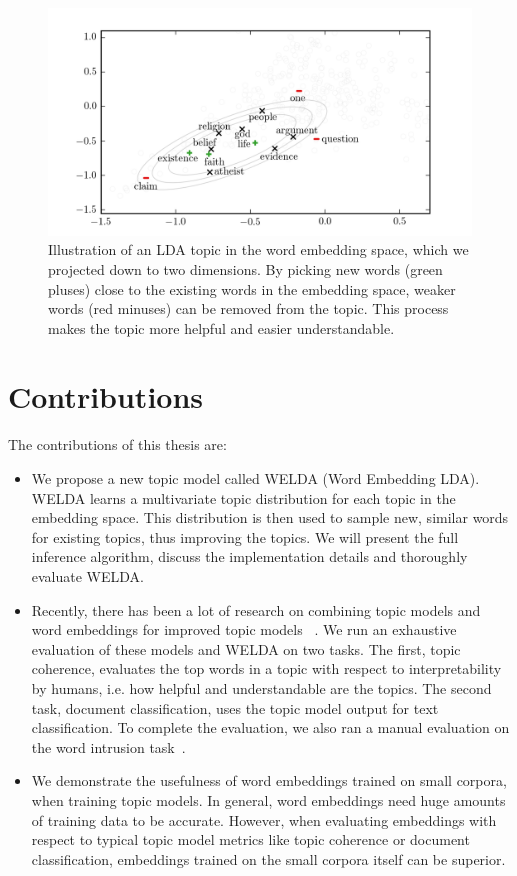 \documentclass[
        a4paper,
        titlepage,
        twoside,
        parskip,
        numbers=noenddot
        ]{scrbook}
\theoremstyle{break}
\begin{document}
\begin{figure}
       \centering
       \includegraphics[width=\textwidth]{figures/figure1.png}
       \caption{Illustration of an LDA topic in the word embedding space, which we projected down to two dimensions.
       By picking new words (green pluses) close to the existing words in the embedding space, weaker words (red minuses) can be removed from the topic. This process makes the topic more helpful and easier understandable.}
       \label{fig:figure1}
\end{figure}

\section{Contributions}
The contributions of this thesis are:
\begin{itemize}
  \item
    We propose a new topic model called WELDA (Word Embedding LDA).
    WELDA learns a multivariate topic distribution for each topic in the embedding space.
    This distribution is then used to sample new, similar words for existing topics, thus improving the topics.
    We will present the full inference algorithm, discuss the implementation details and thoroughly evaluate WELDA.
  \item
    Recently, there has been a lot of research on combining topic models and word embeddings for improved topic models~\cite{Batmanghelich2016,Das2015,Li2016,Nguyen2015} .
    We run an exhaustive evaluation of these models and WELDA on two tasks.
    The first, topic coherence, evaluates the top words in a topic with respect to interpretability by humans, i.e. how helpful and understandable are the topics.
    The second task, document classification, uses the topic model output for text classification.
    To complete the evaluation, we also ran a manual evaluation on the word intrusion task~\cite{Chang2009}.
  \item
    We demonstrate the usefulness of word embeddings trained on small corpora, when training topic models.
    In general, word embeddings need huge amounts of training data to be accurate.
    However, when evaluating embeddings with respect to typical topic model metrics like topic coherence or document classification, embeddings trained on the small corpora itself can be superior.
\end{itemize}
\end{document}

